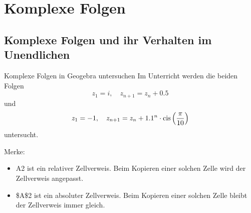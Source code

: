 \section{Komplexe Folgen}

\subsection{Komplexe Folgen und ihr Verhalten im Unendlichen}

\begin{bsp}
    {Komplexe Folgen in Geogebra untersuchen}{}
    Im Unterricht werden die beiden Folgen $$z_1 = i, \quad z_{n+1} = z_n + 0.5$$ und $$z_1 = -1,\quad  z_{n+1} = z_n + 1.1^n \cdot \mathrm{cis}\left(\frac{\pi}{10}\right)$$ untersucht.

    Merke:
    \begin{itemize}
        \item  A2 ist ein relativer Zellverweis. Beim Kopieren einer solchen Zelle wird der Zellverweis angepasst.
        \item \$A\$2 ist ein absoluter Zellverweis. Beim Kopieren einer solchen Zelle bleibt der Zellverweis immer gleich.
    \end{itemize}
\end{bsp}

